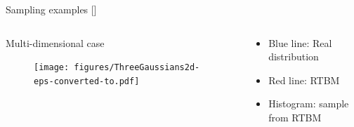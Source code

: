 \documentclass[10pt]{beamer}
\begin{document}
\begin{frame}{Sampling examples \hfill \small [\cite{Carrazza:2018nmd}]}
\begin{figure}[t!]
\begin{center}
        \end{center}
      \end{figure}
      \vspace{-0.5cm}
      \begin{columns}
        \begin{column}{0.6 \textwidth}
            \begin{center}
                Multi-dimensional case
            \end{center}
            \vspace{-0.5cm}
            \begin{figure}[t!]
                \begin{center}
                \texttt{[image: figures/ThreeGaussians2d-eps-converted-to.pdf]}
        
        
                \end{center}
              \end{figure}
        \end{column}
        \begin{column}{0.4 \textwidth}
            \begin{itemize}
                \item Blue line: Real distribution
                \item Red line: RTBM
                \item Histogram: sample from RTBM
            \end{itemize}
        \end{column}
      \end{columns}
     
\end{frame}
\end{document}
